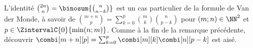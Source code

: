 \begin{remark}
	L'identité 
	$\binom{2n}{n} = \binosum{\binom{n}{n-k}}$
	est un cas particulier de la formule de Van der Monde, à savoir de
	$\binom{m + n}{p} = \sum_{k=0}^p \binom{m}{k} \binom{n}{p-k}$
	pour $(m ; n) \in \NN^2$ et $p \in \ZintervalC{0}{\min(n ; m)}$.
	Comme à la fin de la remarque précédente, découvrir
	$\combi[m + n][p] = \sum_{k=0}^p \combi[m][k] \combi[n][p-k]$
	est aisé. 
\end{remark}




